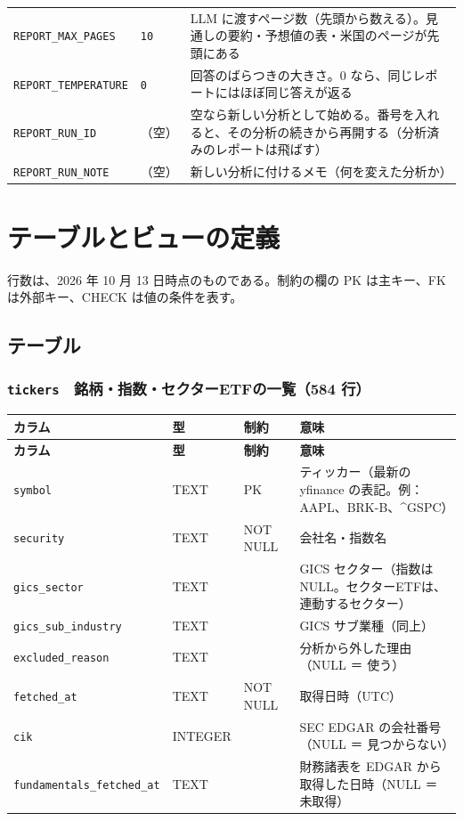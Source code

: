 \documentclass[xelatex,ja=standard,jafont=hiragino-pron,a4paper,10pt]{bxjsreport}
\begin{document}
{\begin{longtable}{p{4.60cm}p{3.60cm}p{6.20cm}}
\texttt{REPORT\_\allowbreak{}MAX\_\allowbreak{}PAGES} & \texttt{10} & LLM に渡すページ数（先頭から数える）。見通しの要約・予想値の表・米国のページが先頭にある \\
\texttt{REPORT\_\allowbreak{}TEMPERATURE} & \texttt{0} & 回答のばらつきの大きさ。0 なら、同じレポートにはほぼ同じ答えが返る \\
\texttt{REPORT\_\allowbreak{}RUN\_\allowbreak{}ID} & （空） & 空なら新しい分析として始める。番号を入れると、その分析の続きから再開する（分析済みのレポートは飛ばす） \\
\texttt{REPORT\_\allowbreak{}RUN\_\allowbreak{}NOTE} & （空） & 新しい分析に付けるメモ（何を変えた分析か） \\
\end{longtable}
}

\chapter{テーブルとビューの定義}\label{app:tables}

行数は、2026 年 10 月 13 日時点のものである。制約の欄の PK は主キー、FK は外部キー、CHECK は値の条件を表す。

\section{テーブル}

\subsection*{\texttt{tickers}　銘柄・指数・セクターETFの一覧（584 行）}
{\footnotesize
\begin{longtable}{p{3.30cm}p{1.40cm}p{3.00cm}p{6.40cm}}
\toprule
\textbf{カラム} & \textbf{型} & \textbf{制約} & \textbf{意味} \\
\midrule
\endfirsthead
\toprule
\textbf{カラム} & \textbf{型} & \textbf{制約} & \textbf{意味} \\
\midrule
\endhead
\bottomrule
\endfoot
\texttt{symbol} & TEXT & PK & ティッカー（最新の yfinance の表記。例：AAPL、BRK-B、\textasciicircum{}GSPC） \\
\texttt{security} & TEXT & NOT NULL & 会社名・指数名 \\
\texttt{gics\_\allowbreak{}sector} & TEXT &  & GICS セクター（指数は NULL。セクターETFは、連動するセクター） \\
\texttt{gics\_\allowbreak{}sub\_\allowbreak{}industry} & TEXT &  & GICS サブ業種（同上） \\
\texttt{excluded\_\allowbreak{}reason} & TEXT &  & 分析から外した理由（NULL ＝ 使う） \\
\texttt{fetched\_\allowbreak{}at} & TEXT & NOT NULL & 取得日時（UTC） \\
\texttt{cik} & INTEGER &  & SEC EDGAR の会社番号（NULL ＝ 見つからない） \\
\texttt{fundamentals\_\allowbreak{}fetched\_\allowbreak{}at} & TEXT &  & 財務諸表を EDGAR から取得した日時（NULL ＝ 未取得） \\
\end{longtable}
}
\end{document}
